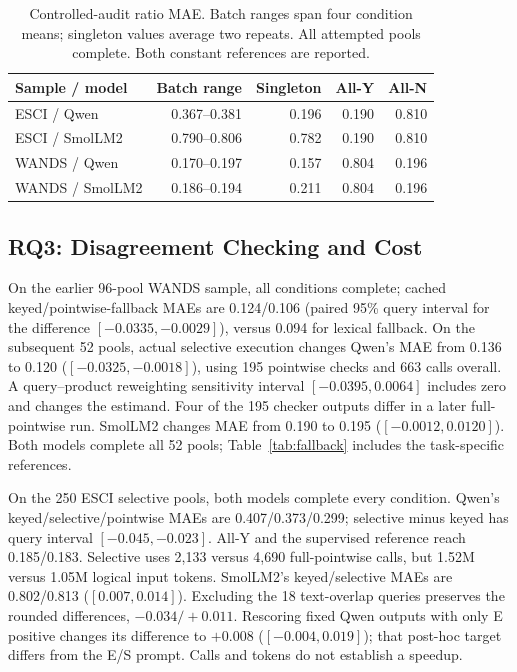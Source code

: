 \documentclass[conference]{IEEEtran}
\begin{document}
\begin{table}[t]
\caption{Controlled-audit ratio MAE. Batch ranges span four condition means; singleton values average two repeats. All attempted pools complete. Both constant references are reported.}
\label{tab:controlled_quality}
\centering\footnotesize
\begin{tabular}{lrrrr}
\toprule
Sample / model & Batch range & Singleton & All-Y & All-N \\
\midrule
ESCI / Qwen & 0.367--0.381 & 0.196 & 0.190 & 0.810 \\
ESCI / SmolLM2 & 0.790--0.806 & 0.782 & 0.190 & 0.810 \\
WANDS / Qwen & 0.170--0.197 & 0.157 & 0.804 & 0.196 \\
WANDS / SmolLM2 & 0.186--0.194 & 0.211 & 0.804 & 0.196 \\
\bottomrule
\end{tabular}
\end{table}

\subsection{RQ3: Disagreement Checking and Cost}
On the earlier 96-pool WANDS sample, all conditions complete; cached keyed/pointwise-fallback MAEs are 0.124/0.106 (paired 95\% query interval for the difference $[-0.0335,-0.0029]$), versus 0.094 for lexical fallback. On the subsequent 52 pools, actual selective execution changes Qwen's MAE from 0.136 to 0.120 ($[-0.0325,-0.0018]$), using 195 pointwise checks and 663 calls overall. A query--product reweighting sensitivity interval $[-0.0395,0.0064]$ includes zero and changes the estimand. Four of the 195 checker outputs differ in a later full-pointwise run. SmolLM2 changes MAE from 0.190 to 0.195 ($[-0.0012,0.0120]$). Both models complete all 52 pools; Table~\ref{tab:fallback} includes the task-specific references.

On the 250 ESCI selective pools, both models complete every condition. Qwen's keyed/selective/pointwise MAEs are 0.407/0.373/0.299; selective minus keyed has query interval $[-0.045,-0.023]$. All-Y and the supervised reference reach 0.185/0.183. Selective uses 2,133 versus 4,690 full-pointwise calls, but 1.52M versus 1.05M logical input tokens. SmolLM2's keyed/selective MAEs are 0.802/0.813 ($[0.007,0.014]$). Excluding the 18 text-overlap queries preserves the rounded differences, $-0.034/+0.011$. Rescoring fixed Qwen outputs with only E positive changes its difference to $+0.008$ ($[-0.004,0.019]$); that post-hoc target differs from the E/S prompt. Calls and tokens do not establish a speedup.
\end{document}
